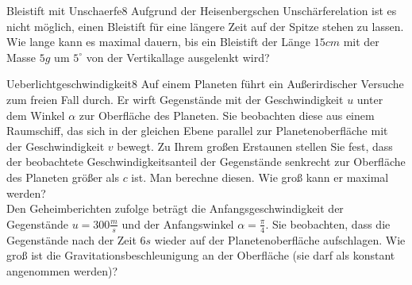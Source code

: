 \begin{problem}{Bleistift mit Unschaerfe}{8}
Aufgrund der Heisenbergschen Unschärferelation ist es nicht möglich, einen Bleistift für eine längere Zeit auf der Spitze stehen zu lassen. Wie lange kann es maximal dauern, bis ein Bleistift der Länge $15\unit{cm}$ mit der Masse $5\unit{g}$ um $5^\circ$ von der Vertikallage ausgelenkt wird?
\end{problem}

\begin{problem}{Ueberlichtgeschwindigkeit}{8}
Auf einem Planeten führt ein Außerirdischer Versuche zum freien Fall durch. Er wirft Gegenstände mit der Geschwindigkeit $u$ unter dem Winkel $\alpha$ zur Oberfläche des Planeten. Sie beobachten diese aus einem Raumschiff, das sich in der gleichen Ebene parallel zur Planetenoberfläche mit der Geschwindigkeit $v$ bewegt. Zu Ihrem großen Erstaunen stellen Sie fest, dass der beobachtete Geschwindigkeitsanteil der Gegenstände senkrecht zur Oberfläche des Planeten größer als $c$ ist. Man berechne diesen. Wie groß kann er maximal werden?\\
Den Geheimberichten zufolge beträgt die Anfangsgeschwindigkeit der Gegenstände $u=300 \unit{\frac{m}{s}}$ und der Anfangswinkel $\alpha=\frac{\pi}{4}$. Sie beobachten, dass die Gegenstände nach der Zeit $6\unit{s}$ wieder auf der Planetenoberfläche aufschlagen. Wie groß ist die Gravitationsbeschleunigung an der Oberfläche (sie darf als konstant angenommen werden)?
\end{problem}

